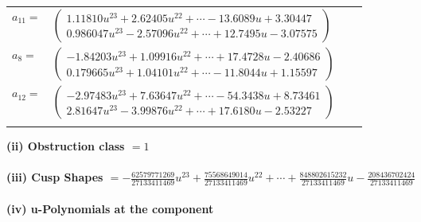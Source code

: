 \documentclass[1p]{elsarticle_modified}
\theoremstyle{definition}
\begin{document}
\begin{tabular}{m{7pt} m{180pt} m{7pt} m{180pt} }
\flushright $a_{11}=$&$\begin{pmatrix}1.11810 u^{23}+2.62405 u^{22}+\cdots-13.6089 u+3.30447\\0.986047 u^{23}-2.57096 u^{22}+\cdots+12.7495 u-3.07575\end{pmatrix}$ \\
\flushright $a_{8}=$&$\begin{pmatrix}-1.84203 u^{23}+1.09916 u^{22}+\cdots+17.4728 u-2.40686\\0.179665 u^{23}+1.04101 u^{22}+\cdots-11.8044 u+1.15597\end{pmatrix}$ \\
\flushright $a_{12}=$&$\begin{pmatrix}-2.97483 u^{23}+7.63647 u^{22}+\cdots-54.3438 u+8.73461\\2.81647 u^{23}-3.99876 u^{22}+\cdots+17.6180 u-2.53227\end{pmatrix}$\\&\end{tabular}
\flushleft \textbf{(ii) Obstruction class $= 1$}\\~\\
\flushleft \textbf{(iii) Cusp Shapes $= -\frac{62579771269}{27133411469} u^{23}+\frac{75568649014}{27133411469} u^{22}+\cdots+\frac{848802615232}{27133411469} u-\frac{208436702424}{27133411469}$}\\~\\
\newpage\renewcommand{\arraystretch}{1}
\flushleft \textbf{(iv) u-Polynomials at the component}\newline \\
\end{document}
